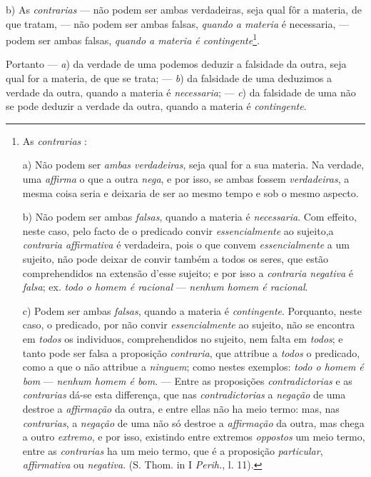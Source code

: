 b) As \emph{contrarias} --- não podem ser ambas verdadeiras, seja qual fôr a materia, de que tratam, --- não podem ser ambas falsas, \emph{quando a materia} é necessaria, --- podem ser ambas falsas, \emph{quando a materia é contingente}\footnote{As \emph{contrarias} :\par a) Não podem ser \emph{ambas verdadeiras}, seja qual for a sua materia. Na verdade, uma \emph{affirma} o que a outra \emph{nega}, e por isso, se ambas fossem \emph{verdadeiras}, a mesma coisa seria e deixaria de ser ao mesmo tempo e sob o mesmo aspecto.\par b) Não podem ser ambas \emph{falsas}, quando a materia é \emph{necessaria}. Com effeito, neste caso, pelo facto de o predicado convir \emph{essencialmente} ao sujeito,a \emph{contraria affirmativa} é verdadeira, pois o que convem \emph{essencialmente} a um sujeito, não pode deixar de convir também a todos os seres, que estão comprehendidos na extensão d'esse sujeito; e por isso a \emph{contraria negativa} é \emph{falsa}; ex. \emph{todo o homem é racional} --- \emph{nenhum homem é racional}.\par c) Podem ser ambas \emph{falsas}, quando a materia é \emph{contingente}. Porquanto, neste caso, o predicado, por não convir \emph{essencialmente} ao sujeito, não se encontra em \emph{todos} os individuos, comprehendidos no sujeito, nem falta em \emph{todos}; e tanto pode ser falsa a proposição \emph{contraria}, que attribue a \emph{todos} o predicado, como a que o não attribue a \emph{ninguem}; como nestes exemplos: \emph{todo o homem é bom} --- \emph{nenhum homem é bom}. --- Entre as proposições \emph{contradictorias} e as \emph{contrarias} dá-se esta differença, que nas \emph{contradictorias} a \emph{negação} de uma destroe a \emph{affirmação} da outra, e entre ellas não ha meio termo: mas, nas \emph{contrarias}, a \emph{negação} de uma não só destroe a \emph{affirmação} da outra, mas chega a outro \emph{extremo}, e por isso, existindo entre extremos \emph{oppostos} um meio termo, entre as \emph{contrarias} ha um meio termo, que é a proposição \emph{particular}, \emph{affirmativa} ou \emph{negativa}. (S. Thom. in I \emph{Perih.}, l. 11).}.

Portanto --- \emph{a}) da verdade de uma podemos deduzir a falsidade da outra, seja qual for a materia, de que se trata; --- \emph{b}) da falsidade de uma deduzimos a verdade da outra, quando a materia é \emph{necessaria}; --- \emph{c}) da falsidade de uma não se pode deduzir a verdade da outra, quando a materia é \emph{contingente}.

